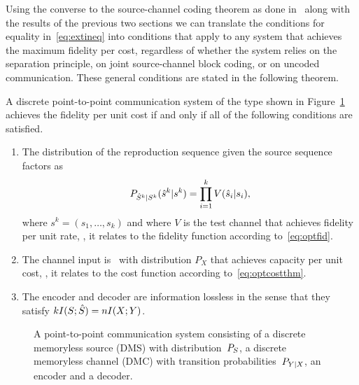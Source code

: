 Using the converse to the source-channel coding theorem as done
in~\cite{GastparThesis} along with the results of the previous two
sections we
can translate the conditions for equality in~\eqref{eq:extineq} into conditions
that apply to any system that achieves the maximum fidelity per cost, regardless
of whether the system relies on the separation principle, on joint
source-channel block coding, or on uncoded communication.  These general
conditions are stated in the following theorem.


\begin{theorem}
  \label{thm:bla}
  A discrete point-to-point communication system of the type shown in
  Figure~\ref{fig:scmodel} achieves the fidelity per unit cost if and only if
  all of the following conditions are satisfied.

\begin{enumerate}
  \item The distribution of the reproduction sequence given the source sequence
    factors as
    \[P_{{\hat{S}}^k|S^k}({\hat{s}}^k|s^k)=\prod_{i=1}^k
    V({\hat{s}}_i|s_i), \]
    where $s^k =(s_1, \ldots, s_k)$  and where $V$ is the test channel that
    achieves fidelity per unit rate, \ie, it relates to the fidelity
    function according to~\eqref{eq:optfid}.
  \item The channel input is \iid\ with distribution $P_X$ that achieves
    capacity per unit cost, \ie, it relates to the cost function according
    to~\eqref{eq:optcostthm}.
  \item The encoder and decoder are information lossless in the sense that they
    satisfy $kI(S;{\hat{S}}) = n I(X;Y)$.  
\end{enumerate}
\end{theorem}

\begin{figure}
  \begin{center}

  \end{center}
  \caption{A point-to-point communication system consisting of a discrete
  memoryless source (DMS) with distribution~${P_S}$, a discrete memoryless channel
  (DMC) with transition probabilities~$P_{Y|X}$, an encoder and a decoder.}
  \label{fig:scmodel}
\end{figure}

